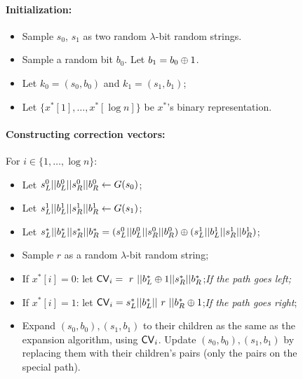 \begin{figure}
    
    \begin{minipage}{\textwidth}
        \begin{mdframed}
            \paragraph{Initialization:} 
            \begin{itemize}
                \item Sample $s_0$, $s_1$ as two random $\lambda$-bit random strings. 
                \item Sample a random bit $b_0$. Let $b_1=b_0\oplus 1$.
                \item Let $k_0 = (s_0, b_0)$ and $k_1=(s_1,b_1)$;
                \item Let $\{x^*[1],\dots,x^*[\log n]\}$ be $x^*$'s binary representation. 
            \end{itemize}
            
            
            \paragraph{Constructing correction vectors:} 
            
            
            For $i\in \{1,\dots, \log n\}$: 
            \begin{itemize}
                \item Let $s^0_L || b^0_L || s^0_R || b^0_R\leftarrow G(s_0)$;
                \item Let $s^1_L || b^1_L || s^1_R || b^1_R\leftarrow G(s_1)$;
                \item Let $s^*_L || b^*_L || s^*_R || b^*_R=(s^0_L || b^0_L || s^0_R || b^0_R) \oplus (s^1_L || b^1_L || s^1_R || b^1_R)$;
                \item Sample $r$ as a random $\lambda$-bit random string;
                \item If $x^*[i]=0$: let ${\sf CV}_i =~ r ~|| b^*_L \oplus 1 || s^*_R || b^*_R$;\hfill \textit{If the path goes left;} 
                \item If $x^*[i]=1$: let ${\sf CV}_i = s^*_L || b^*_L || ~r ~|| b^*_R \oplus 1$;\hfill \textit{If the path goes right}; 
                
                \item Expand $(s_0, b_0), (s_1, b_1)$ to their children as the same as the expansion algorithm, using ${\sf CV}_i$. Update $(s_0, b_0), (s_1, b_1)$ by replacing them with their children's pairs (only the pairs on the special path).  
            \end{itemize}
            

\end{mdframed}
\end{minipage}
\end{figure}
